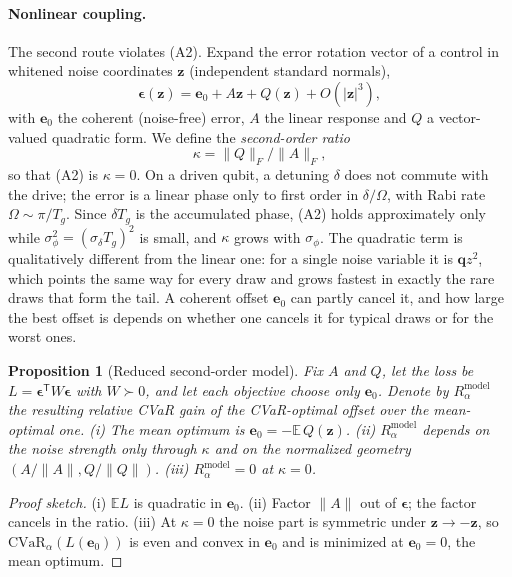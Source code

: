 \documentclass[aps,pra,twocolumn,superscriptaddress,reprint,nofootinbib,floatfix]{revtex4-2}
\newtheorem{proposition}{Proposition}
\theoremstyle{definition}
\newcommand{\cvar}{\mathrm{CVaR}}
\newcommand{\E}{\mathbb{E}}
\newcommand{\Rm}{R^{\mathrm{model}}}
\begin{document}
\paragraph*{Nonlinear coupling.} The second route violates (A2). Expand the
error rotation vector of a control in whitened noise coordinates $\mathbf z$
(independent standard normals),
\begin{equation}
\bm\epsilon(\mathbf z)=\mathbf e_0+A\mathbf z+Q(\mathbf z)+O(|\mathbf z|^3),
\label{eq:expansion}
\end{equation}
with $\mathbf e_0$ the coherent (noise-free) error, $A$ the linear response
and $Q$ a vector-valued quadratic form. We define the \emph{second-order
ratio}
\begin{equation}
\kappa=\|Q\|_F/\|A\|_F ,
\label{eq:kappa}
\end{equation}
so that (A2) is $\kappa=0$. On a driven qubit, a detuning $\delta$ does not
commute with the drive; the error is a linear phase only to first order in
$\delta/\Omega$, with Rabi rate $\Omega\sim\pi/T_g$. Since $\delta T_g$ is
the accumulated phase, (A2) holds approximately only while
$\sigma_\phi^2=(\sigma_\delta T_g)^2$ is small, and $\kappa$ grows with
$\sigma_\phi$. The quadratic term is qualitatively different from the linear
one: for a single noise variable it is $\mathbf qz^2$, which points the same
way for every draw and grows fastest in exactly the rare draws that form the
tail. A coherent offset $\mathbf e_0$ can partly cancel it, and how large the
best offset is depends on whether one cancels it for typical draws or for
the worst ones.

\begin{proposition}[Reduced second-order model]
\label{prop:reduced}
Fix $A$ and $Q$, let the loss be $L=\bm\epsilon^{\mathsf T}W\bm\epsilon$ with
$W\succ0$, and let each objective choose only $\mathbf e_0$. Denote by
$\Rm_\alpha$ the resulting relative CVaR gain of the CVaR-optimal offset over
the mean-optimal one. (i) The mean optimum is $\mathbf e_0=-\E\,Q(\mathbf z)$.
(ii) $\Rm_\alpha$ depends on the noise strength only through $\kappa$ and on
the normalized geometry $(A/\|A\|,Q/\|Q\|)$. (iii) $\Rm_\alpha=0$ at
$\kappa=0$.
\end{proposition}

\begin{proof}[Proof sketch]
(i) $\E L$ is quadratic in $\mathbf e_0$. (ii) Factor $\|A\|$ out of
$\bm\epsilon$; the factor cancels in the ratio. (iii) At $\kappa=0$ the noise
part is symmetric under $\mathbf z\to-\mathbf z$, so
$\cvar_\alpha(L(\mathbf e_0))$ is even and convex in $\mathbf e_0$ and is
minimized at $\mathbf e_0=0$, the mean optimum.
\end{proof}
\end{document}

